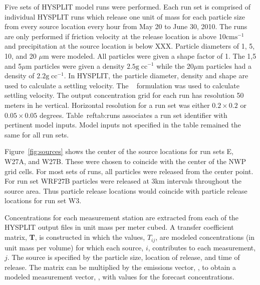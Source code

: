 \documentclass[draft]{agujournal2018}
\begin{document}
Five sets of HYSPLIT model runs were performed. Each run set is comprised of individual HYSPLIT runs which release one unit of mass for each particle size from every source location every hour from May 20 to June 30, 2010. The runs are only performed if friction velocity at the release location is above 10$\mathrm{cm}\mathrm{s}^{-1}$ and
precipitation at the source location is below XXX.
Particle diameters of 1, 5, 10, and 20 $\mu\mathrm{m}$ were modeled. All particles were given a shape factor of 1.
The 1,5 and 5$\mu\mathrm{m}$ particles were given a density $2.5\mathrm{g}\;\mathrm{cc}^{-1}$ while the 20$\mu\mathrm{m}$ particles had a density of 
$2.2\mathrm{g}\;\mathrm{cc}^{-1}$. In HYSPLIT, the particle diameter, density and shape are used
to calculate a settling velocity. The ~\cite{Ganser93, dare} formulation was used to calculate settling velocity.
The output concentration grid for each run has resolution 50 meters in he vertical. Horizontal resolution for a run set was  either $0.2 \times 0.2$ or $0.05 \times 0.05$ degrees.
Table~ref{tab:runs} associates a run set identifier with pertinent model inputs.
Model inputs not specified in the table remained the same for all run sets.

Figure~\ref{fig:sources} shows the center of the source locations for run sets E, W27A, and W27B.
These were chosen to coincide with the center of the NWP grid cells. 
For most sets of runs, all particles
were released from the center point. For run set WRF27B particles were released at 3km intervals throughout the source area. Thus particle
release locations would coincide with particle release locations for run set W3.


Concentrations for each measurement station are extracted from each of the HYSPLIT  output files in unit mass per meter cubed. 
A transfer coefficient matrix, {\bf T}, is constructed in  
which the  values, $T_{ij}$,  are modeled concentrations (in unit mass per volume) for which each source, $i$,  contributes to each measurement, $j$.
The source is specified by the particle size, location of release, and time of release. 
The matrix can be multiplied by the emissions vector, , to obtain a modeled measurement vector, ,  with values for the forecast concentrations.
\end{document}
